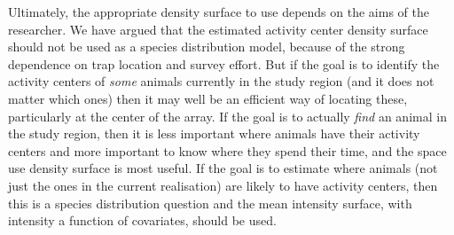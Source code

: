 \documentclass[a4paper,12pt]{article}
\begin{document}
Ultimately, the appropriate density surface to use depends on the aims of the researcher. We have argued that the estimated activity center density surface should not be used as a species distribution model, because of the strong dependence on trap location and survey effort. But if the goal is to identify the activity centers of {\it some} animals currently in the study region (and it does not matter which ones) then it may well be an efficient way of locating these, particularly at the center of the array. If the goal is to actually {\it find} an animal in the study region, then it is less important where animals have their activity centers and more important to know where they spend their time, and the space use density surface is most useful. If the goal is to estimate where animals (not just the ones in the current realisation) are likely to have activity centers, then this is a species distribution question and the mean intensity surface, with intensity a function of covariates, should be used.
\end{document}
